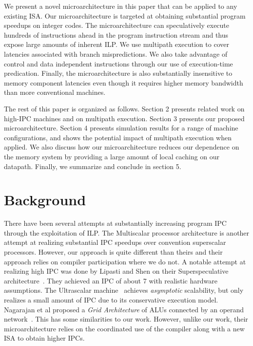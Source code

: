 \documentclass[10pt,dvips]{article}
\begin{document}
We present a novel microarchitecture in this paper that can
be applied to any existing ISA.  Our microarchitecture
is targeted at obtaining
substantial program speedups on integer codes.
The microarchitecture can speculatively execute hundreds
of instructions ahead in the program instruction stream and
thus expose large amounts of inherent ILP.
We use multipath execution to cover latencies associated
with branch mispredictions.
We also take advantage of control
and data independent instructions through our use of
execution-time predication.
Finally, the microarchitecture is also substantially insensitive
to memory component latencies even though it requires higher
memory bandwidth than more conventional machines.

The rest of this paper is organized as follows.
Section 2 presents related work on
high-IPC machines and on multipath execution.
Section 3 presents our proposed microarchitecture.
Section 4 presents simulation results for a range of
machine configurations, and shows the potential
impact of multipath execution when applied.
We also discuss how our microarchitecture reduces
our dependence on the memory system by providing a large
amount of local caching on our datapath. 
Finally, we summarize and conclude in section 5.
%
\section{Background}
%
There have been several attempts at substantially increasing
program IPC through the exploitation of ILP.
The Multiscalar processor architecture \cite{Soh95}
is another attempt at
realizing substantial IPC speedups over convention superscalar
processors.  However, our approach is quite different than theirs
and their approach relies on compiler participation where we do not.
A notable attempt at realizing high IPC was done by
Lipasti and Shen on their Superspeculative
architecture~\cite{Lip97}.  They achieved an IPC of
about 7 with realistic hardware assumptions.
The Ultrascalar machine~\cite{Hen00}
achieves {\em asymptotic} scalability,
but only realizes a small amount of IPC due to its 
conservative execution model.
Nagarajan et al proposed a {\em Grid Architecture} of ALUs
connected by an operand network~\cite{Nag01}.  
This has some similarities to our work.
However, unlike our work, their microarchitecture
relies on the coordinated use of the compiler along with
a new ISA to obtain higher IPCs.
\end{document}
